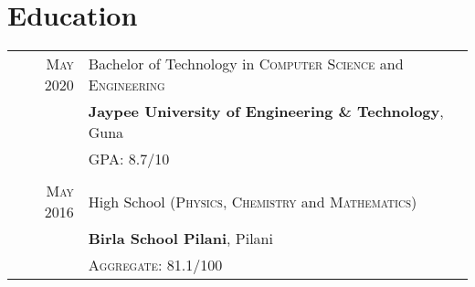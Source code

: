 \documentclass[a4paper,1pt]{article}
\begin{document}
\section{Education}
\begin{tabular}{rl}	
 \textsc{May} 2020 & Bachelor of Technology in \textsc{Computer Science} and \textsc{Engineering}\\& \textbf{Jaypee University of Engineering \& Technology}, Guna\\&
 \normalsize \textsc{GPA}: 8.7/10\\&\\
\textsc{May} 2016& High School (\textsc{Physics}, \textsc{Chemistry} and \textsc{Mathematics})\\&
\normalsize\textbf{Birla School Pilani}, Pilani
\\&\normalsize \textsc{Aggregate}: 81.1/100\\
\end{tabular}



\end{document}
